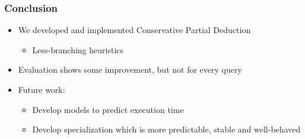 \documentclass[xcolor=table]{beamer}
\begin{document}
\begin{frame}[fragile]
  \frametitle{Conclusion}
  \begin{itemize}
    \item We developed and implemented Conservative Partial Deduction
    \begin{itemize}
      \item Less-branching heuristics
    \end{itemize}
    \item Evaluation shows some improvement, but not for every query
    \item Future work:
    \begin{itemize}
      \item Develop models to predict execution time
      \item Develop specialization which is more predictable, stable and well-behaved
    \end{itemize}
  \end{itemize}
\end{frame}
\end{document}
